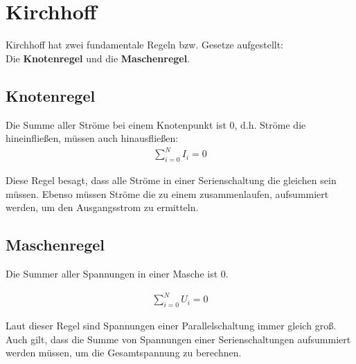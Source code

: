 \chapter{Kirchhoff}
Kirchhoff hat zwei fundamentale Regeln bzw. Gesetze aufgestellt: \\
Die \textbf{Knotenregel} und die \textbf{Maschenregel}.

\section{Knotenregel}
Die Summe aller Ströme bei einem Knotenpunkt ist $0$, d.h. Ströme die hineinfließen, müssen auch hinausfließen:
\begin{align}
    \sum_{i = 0}^{N} I_i = 0
\end{align}

Diese Regel besagt, dass alle Ströme in einer Serienschaltung die gleichen sein müssen. Ebenso müssen Ströme die zu einem zusammenlaufen, aufsummiert werden, um den Ausgangsstrom zu ermitteln.

\section{Maschenregel}
Die Summer aller Spannungen in einer Masche ist $0$.

\begin{align}
    \sum_{i = 0}^{N} U_i = 0
\end{align}

Laut dieser Regel sind Spannungen einer Parallelschaltung immer gleich groß. Auch gilt, dass die Summe von Spannungen einer Serienschaltungen aufsummiert werden müssen, um die Gesamtspannung zu berechnen.